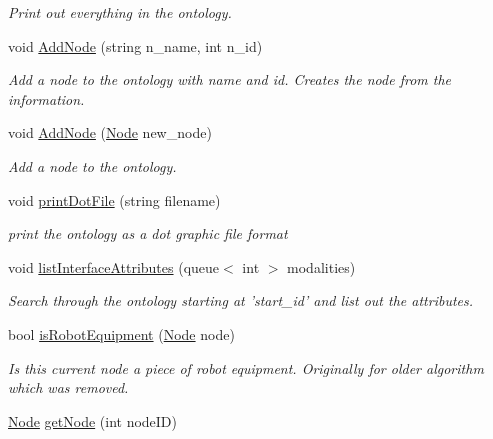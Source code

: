 \begin{DoxyCompactItemize}
\begin{DoxyCompactList}\small\item\em \-Print out everything in the ontology. \end{DoxyCompactList}\item 
void \hyperlink{classOntology_aa775c431c8aee17a538923729f4c9983}{\-Add\-Node} (string n\-\_\-name, int n\-\_\-id)
\begin{DoxyCompactList}\small\item\em \-Add a node to the ontology with name and id. \-Creates the node from the information. \end{DoxyCompactList}\item 
void \hyperlink{classOntology_a5fadbf06a51d3aff595bcebde5dcca87}{\-Add\-Node} (\hyperlink{classNode}{\-Node} new\-\_\-node)
\begin{DoxyCompactList}\small\item\em \-Add a node to the ontology. \end{DoxyCompactList}\item 
void \hyperlink{classOntology_a932660c50241f6016a0d3c4b2d1dc28f}{print\-Dot\-File} (string filename)
\begin{DoxyCompactList}\small\item\em print the ontology as a dot graphic file format \end{DoxyCompactList}\item 
void \hyperlink{classOntology_a575da03cda7e74cc55c4eea805e72436}{list\-Interface\-Attributes} (queue$<$ int $>$ modalities)
\begin{DoxyCompactList}\small\item\em \-Search through the ontology starting at 'start\-\_\-id' and list out the attributes. \end{DoxyCompactList}\item 
\hypertarget{classOntology_a69ca087e5a24dbab5aa4f95c78ed45da}{bool \hyperlink{classOntology_a69ca087e5a24dbab5aa4f95c78ed45da}{is\-Robot\-Equipment} (\hyperlink{classNode}{\-Node} node)}\label{classOntology_a69ca087e5a24dbab5aa4f95c78ed45da}

\begin{DoxyCompactList}\small\item\em \-Is this current node a piece of robot equipment. \-Originally for older algorithm which was removed. \end{DoxyCompactList}\item 
\hypertarget{classOntology_a5e103b7d433796b6e93c2e01decf955a}{\hyperlink{classNode}{\-Node} \hyperlink{classOntology_a5e103b7d433796b6e93c2e01decf955a}{get\-Node} (int node\-I\-D)}\label{classOntology_a5e103b7d433796b6e93c2e01decf955a}


\end{DoxyCompactItemize}
